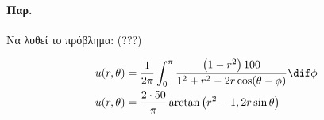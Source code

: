 \documentclass[12pt,a4paper,notitlepage,fleqn]{article}
\begin{document}
    \paragraph{Παρ.}
    Να λυθεί το πρόβλημα: (???)
    
    \begin{align*}
    	u(r,\theta) &= \frac{1}{2\pi} \int_{0}^{\pi}
    	\frac{\left(1-r^2\right)100}{1^2+r^2-2r\cos(\theta-\phi)}\dif\phi
    	\\
    	u(r,\theta) &= \frac{2\cdot 50}{\pi} \arctan\left(r^2-1,2r\sin\theta\right)
    \end{align*}
    
    \paragraph{}
\end{document}
